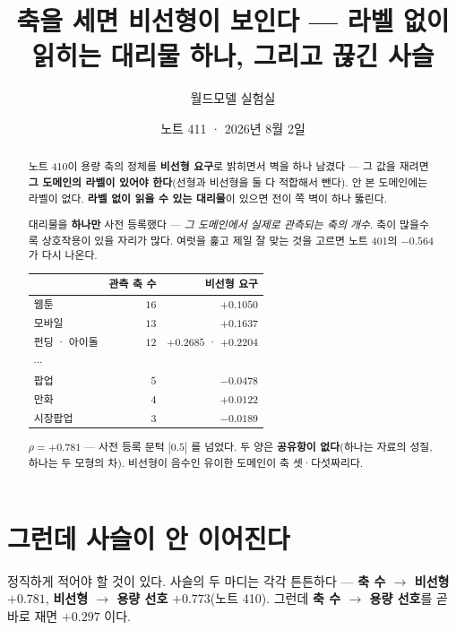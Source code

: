 \documentclass[11pt]{article}
\begin{document}
\title{축을 세면 비선형이 보인다 --- 라벨 없이 읽히는 대리물 하나, 그리고 끊긴 사슬}
\author{월드모델 실험실}
\date{노트 411 · 2026년 8월 2일}
\maketitle

\begin{abstract}
노트 410이 용량 축의 정체를 \textbf{비선형 요구}로 밝히면서 벽을 하나 남겼다
--- 그 값을 재려면 \textbf{그 도메인의 라벨이 있어야 한다}(선형과 비선형을
둘 다 적합해서 뺀다). 안 본 도메인에는 라벨이 없다. \textbf{라벨 없이 읽을
수 있는 대리물}이 있으면 전이 쪽 벽이 하나 뚫린다.

대리물을 \textbf{하나만} 사전 등록했다 --- \emph{그 도메인에서 실제로
관측되는 축의 개수}. 축이 많을수록 상호작용이 있을 자리가 많다. 여럿을
훑고 제일 잘 맞는 것을 고르면 노트 401의 $-0.564$ 가 다시 나온다.

\begin{center}
\begin{tabular}{lrr}
\hline
 & 관측 축 수 & 비선형 요구 \\
\hline
웹툰 & $16$ & $+0.1050$ \\
모바일 & $13$ & $+0.1637$ \\
펀딩 · 아이돌 & $12$ & $+0.2685$ · $+0.2204$ \\
$\cdots$ & & \\
팝업 & $5$ & $\mathbf{-0.0478}$ \\
만화 & $4$ & $+0.0122$ \\
시장팝업 & $3$ & $\mathbf{-0.0189}$ \\
\hline
\end{tabular}
\end{center}

$\rho = \mathbf{+0.781}$ --- 사전 등록 문턱 $|0.5|$ 를 넘었다. 두 양은
\textbf{공유항이 없다}(하나는 자료의 성질, 하나는 두 모형의 차). 비선형이
음수인 유이한 도메인이 축 셋·다섯짜리다.
\end{abstract}

\section{그런데 사슬이 안 이어진다}

정직하게 적어야 할 것이 있다. 사슬의 두 마디는 각각 튼튼하다 ---
\textbf{축 수 $\to$ 비선형} $+0.781$, \textbf{비선형 $\to$ 용량 선호}
$+0.773$(노트 410). 그런데 \textbf{축 수 $\to$ 용량 선호}를 곧바로 재면
$\mathbf{+0.297}$ 이다.
\end{document}
